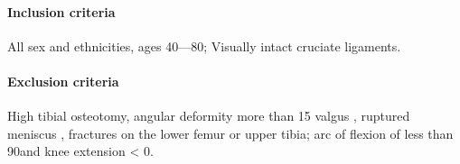 \paragraph{Inclusion criteria}
All sex and ethnicities, ages 40---80; Visually intact cruciate ligaments.

\paragraph{Exclusion criteria}
High tibial osteotomy, angular deformity more than 15 \degree{} valgus \cite{kozinn_current_1989}, ruptured meniscus \cite{makhmalbaf_accuracy_2013}, fractures on the lower femur or upper tibia; arc of flexion of less than 90\degree and knee extension < 0\degree.

